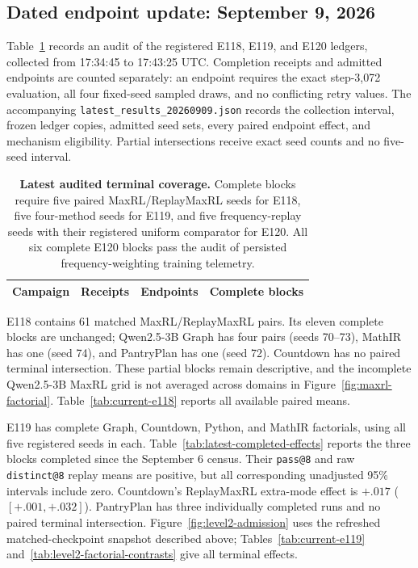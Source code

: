 \documentclass{article}
\newcommand{\1}{\mathbf 1}
\theoremstyle{remark}
\theoremstyle{definition}
\theoremstyle{plain}
\begin{document}
\subsection{Dated endpoint update: September 9, 2026}
\label{app:latest-results-update}

Table~\ref{tab:latest-results-update} records an audit of the registered
E118, E119, and E120 ledgers, collected from 17:34:45 to 17:43:25 UTC.
Completion receipts and admitted endpoints are counted separately: an endpoint
requires the exact step-3,072 evaluation, all four fixed-seed sampled draws,
and no conflicting retry values. The accompanying
\texttt{latest\_results\_20260909.json} records the collection interval,
frozen ledger copies, admitted seed sets, every paired endpoint effect, and
mechanism eligibility. Partial intersections receive exact seed counts and
no five-seed interval.

\begin{table}[H]
  \centering
  \caption{\textbf{Latest audited terminal coverage.}
  Complete blocks require five paired MaxRL/ReplayMaxRL seeds for E118,
  five four-method seeds for E119, and five frequency-replay seeds with
  their registered uniform comparator for E120. All six complete E120 blocks
  pass the audit of persisted frequency-weighting training telemetry.}
  \label{tab:latest-results-update}
  \small
  \setlength{\tabcolsep}{5pt}
  \begin{tabular}{@{}lrrr@{}}
    \toprule
    \textbf{Campaign} & \textbf{Receipts} & \textbf{Endpoints}
      & \textbf{Complete blocks} \\
    \midrule
    
  \end{tabular}
\end{table}

E118 contains 61 matched MaxRL/ReplayMaxRL pairs. Its eleven complete
blocks are unchanged; Qwen2.5-3B Graph has four pairs (seeds 70--73),
MathIR has one (seed 74), and PantryPlan has one (seed 72). Countdown
has no paired terminal intersection. These partial blocks remain descriptive,
and the incomplete Qwen2.5-3B MaxRL grid is not averaged across domains in
Figure~\ref{fig:maxrl-factorial}. Table~\ref{tab:current-e118} reports all
available paired means.

E119 has complete Graph, Countdown, Python, and MathIR factorials,
using all five registered seeds in each. Table~\ref{tab:latest-completed-effects}
reports the three blocks completed since the September 6 census. Their
\texttt{pass@8} and raw \texttt{distinct@8} replay means are positive, but all
corresponding unadjusted 95\% intervals include zero. Countdown's ReplayMaxRL
extra-mode effect is $+.017$ ($[+.001,+.032]$). PantryPlan has three
individually completed runs and no paired terminal intersection.
Figure~\ref{fig:level2-admission} uses the refreshed matched-checkpoint
snapshot described above; Tables~\ref{tab:current-e119}
and~\ref{tab:level2-factorial-contrasts} give all terminal effects.
\end{document}
